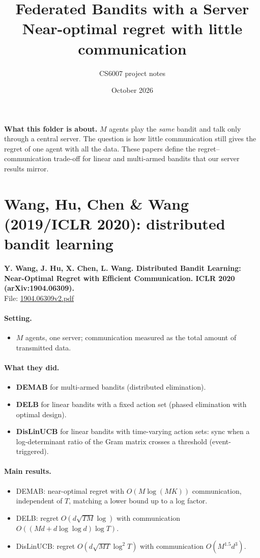 \documentclass[11pt]{article}
\title{Federated Bandits with a Server\\[2pt]\large Near-optimal regret with little communication}
\author{CS6007 project notes}
\date{October 2026}
\newcommand{\file}[1]{\url{#1}}
\begin{document}
\maketitle
\textbf{What this folder is about.} $M$ agents play the \emph{same} bandit and talk only
through a central server. The question is how little communication still gives the regret of
one agent with all the data. These papers define the regret--communication trade-off for linear
and multi-armed bandits that our server results mirror.
\tableofcontents
\bigskip
\section{Wang, Hu, Chen \& Wang (2019/ICLR 2020): distributed bandit learning}
\textbf{Y. Wang, J. Hu, X. Chen, L. Wang. Distributed Bandit Learning: Near-Optimal Regret with Efficient Communication. ICLR 2020 (arXiv:1904.06309).}\\ File: \file{1904.06309v2.pdf}
\paragraph{Setting.}
\begin{itemize}\item $M$ agents, one server; communication measured as the total amount of transmitted data.\end{itemize}
\paragraph{What they did.}
\begin{itemize}\item \textbf{DEMAB} for multi-armed bandits (distributed elimination).\item \textbf{DELB} for linear bandits with a fixed action set (phased elimination with optimal design).\item \textbf{DisLinUCB} for linear bandits with time-varying action sets: sync when a log-determinant ratio of the Gram matrix crosses a threshold (event-triggered).\end{itemize}
\paragraph{Main results.}
\begin{itemize}\item DEMAB: near-optimal regret with $O(M\log(MK))$ communication, independent of $T$, matching a lower bound up to a log factor.\item DELB: regret $O(d\sqrt{TM}\log)$ with communication $O((Md+d\log\log d)\log T)$.\item DisLinUCB: regret $O(d\sqrt{MT}\log^2T)$ with communication $O(M^{1.5}d^3)$.\end{itemize}
\end{document}
